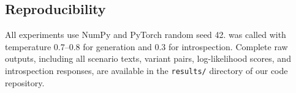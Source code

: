 \subsection{Reproducibility}

All experiments use NumPy and PyTorch random seed 42. \gptfour was called with temperature 0.7--0.8 for generation and 0.3 for introspection. Complete raw outputs, including all scenario texts, variant pairs, log-likelihood scores, and introspection responses, are available in the \texttt{results/} directory of our code repository.
